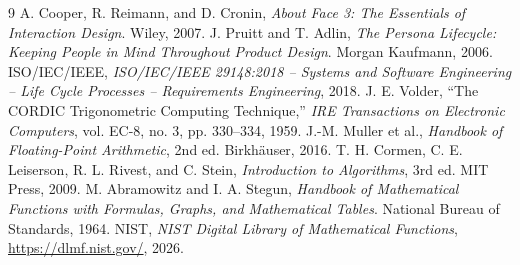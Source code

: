 \documentclass[11pt]{article}
\begin{document}
\begin{thebibliography}{9}
 A. Cooper, R. Reimann, and D. Cronin, \emph{About Face 3: The Essentials of Interaction Design}. Wiley, 2007.
 J. Pruitt and T. Adlin, \emph{The Persona Lifecycle: Keeping People in Mind Throughout Product Design}. Morgan Kaufmann, 2006.
 ISO/IEC/IEEE, \emph{ISO/IEC/IEEE 29148:2018 -- Systems and Software Engineering -- Life Cycle Processes -- Requirements Engineering}, 2018.
 J. E. Volder, ``The CORDIC Trigonometric Computing Technique,'' \emph{IRE Transactions on Electronic Computers}, vol. EC-8, no. 3, pp. 330--334, 1959.
 J.-M. Muller et al., \emph{Handbook of Floating-Point Arithmetic}, 2nd ed. Birkh\"auser, 2016.
 T. H. Cormen, C. E. Leiserson, R. L. Rivest, and C. Stein, \emph{Introduction to Algorithms}, 3rd ed. MIT Press, 2009.
 M. Abramowitz and I. A. Stegun, \emph{Handbook of Mathematical Functions with Formulas, Graphs, and Mathematical Tables}. National Bureau of Standards, 1964.
 NIST, \emph{NIST Digital Library of Mathematical Functions}, \url{https://dlmf.nist.gov/}, 2026.
\end{thebibliography}
\end{document}
